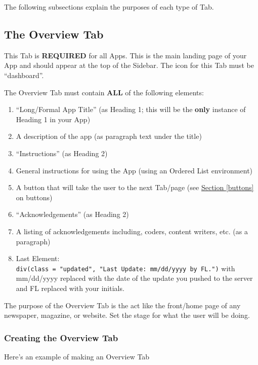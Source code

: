 \documentclass[
]{book}
\providecommand{\tightlist}{%
  \setlength{\itemsep}{0pt}\setlength{\parskip}{0pt}}
\begin{document}
The following subsections explain the purposes of each type of Tab.

\hypertarget{the-overview-tab}{%
\subsection{The Overview Tab}\label{the-overview-tab}}

This Tab is \textbf{REQUIRED} for all Apps. This is the main landing page of your App and should appear at the top of the Sidebar. The icon for this Tab must be ``dashboard''.

The Overview Tab must contain \textbf{ALL} of the following elements:

\begin{enumerate}
\def\labelenumi{\arabic{enumi}.}
\tightlist
\item
  ``Long/Formal App Title'' (as Heading 1; this will be the \textbf{only} instance of Heading 1 in your App)
\item
  A description of the app (as paragraph text under the title)
\item
  ``Instructions'' (as Heading 2)
\item
  General instructions for using the App (using an Ordered List environment)
\item
  A button that will take the user to the next Tab/page (see \protect\hyperlink{buttons}{Section \ref{buttons}} on buttons)
\item
  ``Acknowledgements'' (as Heading 2)
\item
  A listing of acknowledgements including, coders, content writers, etc. (as a paragraph)
\item
  Last Element: \texttt{div(class\ =\ "updated",\ "Last\ Update:\ mm/dd/yyyy\ by\ FL.")} with mm/dd/yyyy replaced with the date of the update you pushed to the server and FL replaced with your initials.
\end{enumerate}

The purpose of the Overview Tab is the act like the front/home page of any newspaper, magazine, or website. Set the stage for what the user will be doing.

\hypertarget{creating-the-overview-tab}{%
\subsubsection{Creating the Overview Tab}\label{creating-the-overview-tab}}

Here's an example of making an Overview Tab
\end{document}

